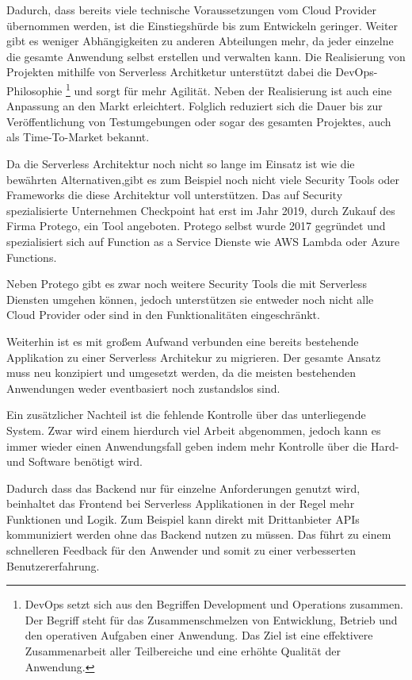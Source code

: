 Dadurch, dass bereits viele technische Voraussetzungen vom Cloud Provider übernommen werden, ist die Einstiegshürde bis zum Entwickeln geringer.
Weiter gibt es weniger Abhängigkeiten zu anderen Abteilungen mehr, da jeder einzelne die gesamte Anwendung selbst erstellen und verwalten kann.
Die Realisierung von Projekten mithilfe von Serverless Architketur unterstützt dabei die DevOps-Philosophie
\footnote{DevOps setzt sich aus den Begriffen Development und Operations zusammen. Der Begriff steht für
das Zu­sam­men­schmel­zen von Entwicklung, Betrieb und den operativen Aufgaben einer Anwendung. Das Ziel ist eine effektivere
Zusammenarbeit aller Teilbereiche und eine erhöhte Qualität der Anwendung.} und sorgt für mehr Agilität.
Neben der Realisierung ist auch eine Anpassung an den Markt erleichtert.
Folglich reduziert sich die Dauer bis zur Veröffentlichung von Testumgebungen oder sogar des gesamten Projektes, auch
als Time-To-Market bekannt.\cite[]{DevOps}


Da die Serverless Architektur noch nicht so lange im Einsatz ist wie die bewährten Alternativen,gibt es zum Beispiel noch nicht
viele Security Tools oder Frameworks die diese Architektur voll unterstützen. Das auf Security spezialisierte Unternehmen Checkpoint
hat erst im Jahr 2019, durch Zukauf des Firma Protego, ein Tool angeboten. Protego selbst wurde 2017 gegründet und spezialisiert
sich auf Function as a Service Dienste wie AWS Lambda oder Azure Functions. \cite[]{Checkpoint}

Neben Protego gibt es zwar noch weitere Security Tools die mit Serverless Diensten umgehen können, jedoch unterstützen sie
entweder noch nicht alle Cloud Provider oder sind in den Funktionalitäten eingeschränkt. \cite[]{Security}

Weiterhin ist es mit großem Aufwand verbunden eine bereits bestehende Applikation zu einer Serverless Architekur zu migrieren.
Der gesamte Ansatz muss neu konzipiert und umgesetzt werden, da die meisten bestehenden Anwendungen
weder eventbasiert noch zustandslos sind.

Ein zusätzlicher Nachteil ist die fehlende Kontrolle über das unterliegende System. Zwar wird einem hierdurch viel Arbeit abgenommen, jedoch kann es immer wieder
einen Anwendungsfall geben indem mehr Kontrolle über die Hard- und Software benötigt wird.

Dadurch dass das Backend nur für einzelne Anforderungen genutzt wird, beinhaltet das Frontend bei Serverless Applikationen
in der Regel mehr Funktionen und Logik. Zum Beispiel kann direkt mit Drittanbieter APIs kommuniziert werden ohne das Backend nutzen zu müssen.
Das führt zu einem schnelleren Feedback für den Anwender und somit zu einer verbesserten Benutzererfahrung.

